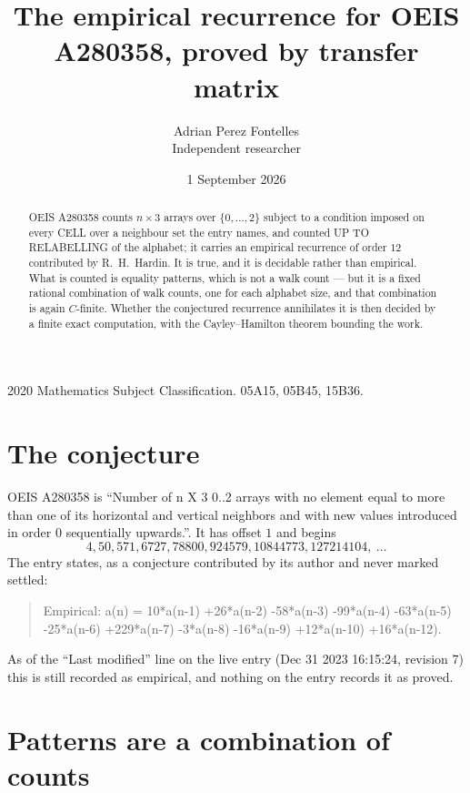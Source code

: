 \documentclass[11pt,a4paper]{article}
\title{The empirical recurrence for OEIS A280358, proved by transfer matrix}
\author{Adrian Perez Fontelles\\ \small Independent researcher}
\date{1 September 2026}
\theoremstyle{plain}
\theoremstyle{definition}
\begin{document}
\maketitle

\begin{abstract}
OEIS A280358 counts $n\times3$ arrays over $\{0,\dots,2\}$ subject to a condition imposed on
every CELL over a neighbour set the entry names, and counted UP TO RELABELLING of the
alphabet; it carries an empirical recurrence of order $12$ contributed by
R.~H.~Hardin. It is true, and it is decidable rather than empirical. What is counted is
equality patterns, which is not a walk count --- but it is a fixed rational combination of
walk counts, one for each alphabet size, and that combination is again $C$-finite. Whether the
conjectured recurrence annihilates it is then decided by a finite exact computation, with the
Cayley--Hamilton theorem bounding the work.
\end{abstract}

\noindent\small 2020 Mathematics Subject Classification. 05A15, 05B45, 15B36.\normalsize

\section{The conjecture}

OEIS A280358 is ``Number of n X 3 0..2 arrays with no element equal to more than one of its horizontal and vertical neighbors and with new values introduced in order 0 sequentially upwards.''. It has offset $1$ and begins
\[
4, 50, 571, 6727, 78800, 924579, 10844773, 127214104,\ \dots
\]
The entry states, as a conjecture contributed by its author and never marked settled:
\begin{quote}
Empirical: a(n) = 10*a(n-1) +26*a(n-2) -58*a(n-3) -99*a(n-4) -63*a(n-5) -25*a(n-6) +229*a(n-7) -3*a(n-8) -16*a(n-9) +12*a(n-10) +16*a(n-12).
\end{quote}
As of the ``Last modified'' line on the live entry (Dec 31 2023 16:15:24, revision 7) this is still
recorded as empirical, and nothing on the entry records it as proved.

\section{Patterns are a combination of counts}
\end{document}
